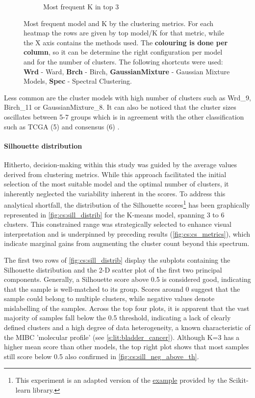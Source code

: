 \begin{figure}[!htb]
\begin{subfigure}[!t]{0.65\textwidth}
        \caption{Most frequent K in top 3}
        \label{fig:cs:heatmap_cs}
    \end{subfigure}
    \caption{Most frequent model and K by the clustering metrics. For each heatmap the rows are given by top model/K for that metric, while the X axis contains the methods used. The \textbf{colouring is done per column}, so it can be determine the right configuration per model and for the number of clusters. The following shortcuts were used: \textbf{Wrd} - Ward, \textbf{Brch} - Birch, \textbf{GaussianMixture} - Gaussian Mixture Models, \textbf{Spec} - Spectral Clustering.}
    \label{fig:cs:cs_metrics_heatmap}
\end{figure}


Less common are the cluster models with high number of clusters such as Wrd\_9, Birch\_11 or GaussianMixture\_8. It can also be noticed that the cluster sizes oscillates between 5-7 groups which is in agreement with the other classification such as TCGA (5) and consensus (6) \citet{Robertson2017-mg,Kamoun2020-tj}.





\paragraph*{Silhouette distribution}

Hitherto, decision-making within this study was guided by the average values derived from clustering metrics. While this approach facilitated the initial selection of the most suitable model and the optimal number of clusters, it inherently neglected the variability inherent in the scores. To address this analytical shortfall, the distribution of the Silhouette scores\footnote{This experiment is an adapted version of the \href{https://tinyurl.com/sillhouete-distrib}{example} provided by the Scikit-learn library.} has been graphically represented in \cref{fig:cs:sill_distrib} for the K-means model, spanning 3 to 6 clusters. This constrained range was strategically selected to enhance visual interpretation and is underpinned by preceding results (\cref{fig:cs:cs_metrics}), which indicate marginal gains from augmenting the cluster count beyond this spectrum.


The first two rows of \cref{fig:cs:sill_distrib} display the subplots containing the Silhouette distribution and the 2-D scatter plot of the first two principal components. Generally, a Silhouette score above 0.5 is considered good, indicating that the sample is well-matched to its group. Scores around 0 suggest that the sample could belong to multiple clusters, while negative values denote mislabelling of the samples. Across the top four plots, it is apparent that the vast majority of samples fall below the 0.5 threshold, indicating a lack of clearly defined clusters and a high degree of data heterogeneity, a known characteristic of the MIBC 'molecular profile' (see \cref{s:lit:bladder_cancer}). Although K=3 has a higher mean score than other models, the top right plot shows that most samples still score below 0.5 also confirmed in \cref{fig:cs:sill_neg_above_th}.

